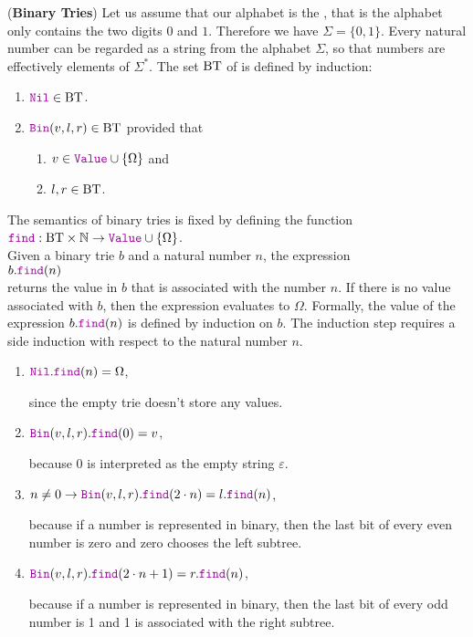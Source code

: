 \exercise
(\textbf{Binary Tries})  Let us assume that our alphabet is the , that is the alphabet
only contains the two digits $0$ and $1$.  Therefore we have $\Sigma = \{0,1\}$.  Every natural
number can be regarded as a string from the alphabet $\Sigma$, so that numbers are effectively
elements of $\Sigma^*$.  The set $\mathrm{BT}$ of  is defined by induction:
\begin{enumerate}
\item $\mytt{Nil} \in \BT$.
\item $\mytt{Bin}(v,l,r) \in \BT$ provided that
      \begin{enumerate}
      \item $v \in \mytt{Value} \cup \{\Omega\}$ \quad and
      \item $l,r \in \mathrm{BT}$.
      \end{enumerate}
\end{enumerate}
The semantics of binary tries is fixed by defining the function
\\[0.2cm]
\hspace*{1.3cm}
$\mytt{find}: \BT \times \mathbb{N} \rightarrow \mytt{Value} \cup \{ \Omega \}$.
\\[0.2cm]
Given a binary trie $b$ and a natural number $n$, the expression
\\[0.2cm]
\hspace*{1.3cm}
$b.\mytt{find}(n)$ 
\\[0.2cm]
returns the value in $b$ that is associated with the number $n$.  If there is no value associated
with $b$, then the expression evaluates to $\Omega$.  Formally, the value of the expression
 $b.\mytt{find}(n)$ is defined by induction on $b$.  The induction step requires a side induction
 with respect to the natural number $n$.
\begin{enumerate}
\item $\mytt{Nil}.\mytt{find}(n) = \Omega$,

      since the empty trie doesn't store any values.
\item $\mytt{Bin}(v,l,r).\mytt{find}(0) = v$,

      because $0$ is interpreted as the empty string $\varepsilon$.
\item $n \not= 0 \rightarrow \mytt{Bin}(v,l,r).\mytt{find}(2\cdot n) = l.\mytt{find}(n)$,

      because if a number is represented in binary, then the last bit of every even number is zero
      and zero chooses the left subtree.
\item $\mytt{Bin}(v,l,r).\mytt{find}(2 \cdot n + 1) = r.\mytt{find}(n)$,

      because if a number is represented in binary, then the last bit of every odd number is 1 and 
      1 is associated with the right subtree.
\end{enumerate}
